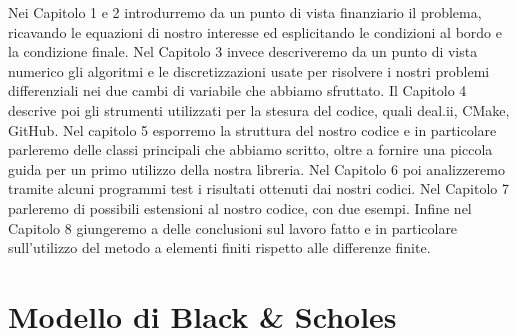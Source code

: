 \documentclass[a4paper,10pt]{report}
\theoremstyle{plain}
\theoremstyle{definition}
\theoremstyle{remark}
\begin{document}
Nei Capitolo 1 e 2 introdurremo da un punto di vista finanziario il problema, ricavando le equazioni di nostro interesse ed esplicitando le condizioni al bordo e la condizione finale. Nel Capitolo 3 invece descriveremo da un punto di vista numerico gli algoritmi e le discretizzazioni usate per risolvere i nostri problemi differenziali nei due cambi di variabile che abbiamo sfruttato. Il Capitolo 4 descrive poi gli strumenti utilizzati per la stesura del codice, quali \textsf{deal.ii}, \textsf{CMake}, GitHub. Nel capitolo 5 esporremo la struttura del nostro codice e in particolare parleremo delle classi principali che abbiamo scritto, oltre a fornire una piccola guida per un primo utilizzo della nostra libreria. Nel Capitolo 6 poi analizzeremo tramite alcuni programmi test i risultati ottenuti dai nostri codici. Nel Capitolo 7 parleremo di possibili estensioni al nostro codice, con due esempi. Infine nel Capitolo 8 giungeremo a delle conclusioni sul lavoro fatto e in particolare sull'utilizzo del metodo a elementi finiti rispetto alle differenze finite.

\chapter{Modello di Black \& Scholes}
\end{document}
